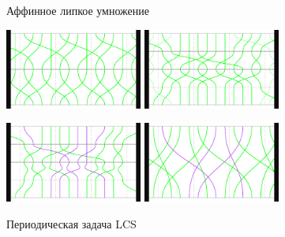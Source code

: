 \documentclass[svgnames]{beamer}
\begin{document}
\begin{frame}{Аффинное липкое умножение}

\begin{center}
  \includegraphics[width=4.5cm]{img-fg/PQ-base} \hspace{4mm}
  \includegraphics[width=4.5cm]{img-fg/PQ-GF3n} \vspace{2mm}

  \includegraphics[width=4.5cm]{img-fg/PQ-GF3n-untg} \hspace{4mm}
  \includegraphics[width=4.5cm]{img-fg/PQ-GF3n-z}  
\end{center}

\end{frame}


\begin{frame}{Периодическая задача LCS}
\end{frame}
\end{document}
